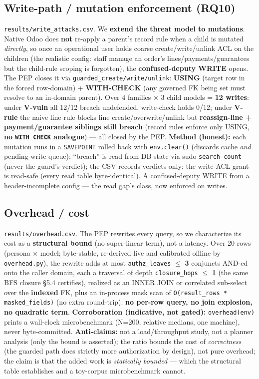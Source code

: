 \documentclass[runningheads]{llncs}
\newcommand{\code}[1]{\texttt{#1}}
\begin{document}
\subsection{Write-path / mutation enforcement (RQ10)}
\code{results/write_attacks.csv}. We \textbf{extend the threat model to mutations}. Native Odoo does \textbf{not}
re-apply a parent's record rule when a child is mutated \emph{directly}, so once an operational user holds coarse
create/write/unlink ACL on the children (the realistic config: staff manage an order's lines/payments/guarantees
but the child-rule scoping is forgotten), the \textbf{confused-deputy WRITE} opens. The PEP closes it via
\code{guarded\_create/write/unlink}: \textbf{USING} (target row in the forced row-domain) + \textbf{WITH-CHECK}
(any governed FK being set must resolve to an in-domain parent). Over 4 families $\times$ 3 child models =
\textbf{12 writes}: under \textbf{V-vuln} all 12/12 breach undefended, write-check holds 0/12; under \textbf{V-rule}
the naive line rule blocks line create/overwrite/unlink but \textbf{reassign-line + payment/guarantee siblings
still breach} (record rules enforce only USING, \textbf{no \code{WITH CHECK} analogue}) --- all closed by the PEP.
\textbf{Method (honest):} each mutation runs in a \code{SAVEPOINT} rolled back with \code{env.clear()} (discards
cache \emph{and} pending-write queue); ``breach'' is read from DB state via sudo \code{search\_count} (never the
guard's verdict); the CSV records verdicts only; the write-ACL grant is read-safe (every read table byte-identical).
A confused-deputy WRITE from a header-incomplete config --- the read gap's class, now enforced on writes.

\subsection{Overhead / cost}
\code{results/overhead.csv}. The PEP rewrites every query, so we characterize its cost as a \textbf{structural
bound} (no super-linear term), not a latency. Over 20 rows (persona $\times$ model; byte-stable, re-derived live
and calibrated offline by \code{overhead.py}), the rewrite adds at most \code{authz\_leaves} $\le$ \textbf{3}
conjuncts AND-ed onto the caller domain, each a traversal of depth \code{closure\_hops} $\le$ \textbf{1} (the same
BFS closure \S5.4 certifies), realized as an INNER JOIN or correlated sub-select over the \textbf{indexed} FK, plus
an in-process mask scan of \code{O(result\_rows * masked\_fields)} (no extra round-trip): \textbf{no per-row query,
no join explosion, no quadratic term}. \textbf{Corroboration (indicative, not gated):} \code{overhead(env)} prints
a wall-clock microbenchmark (N=200, relative medians, one machine), never byte-committed. \textbf{Anti-claims:} not
a load/throughput study, not a planner analysis (only the bound is asserted); the ratio bounds the cost of
\emph{correctness} (the guarded path does strictly more authorization by design), not pure overhead; the claim is
that the added work is \emph{statically bounded} --- which the structural table establishes and a toy-corpus
microbenchmark cannot.
\end{document}
